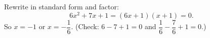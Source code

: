 Rewrite in standard form and factor:
\[6x^2+7x+1=(6x+1)(x+1)=0.\]
So $x=\boxed{-1}$ or $x=\boxed{-\dfrac{1}{6}}$. (Check: $6-7+1=0$ and $\dfrac{1}{6}-\dfrac{7}{6}+1=0$.)
